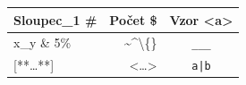 \begin{tabular}{lrc}
\toprule
Sloupec\_1 \# & Počet \$ & Vzor \textless{}a\textgreater{}\\
\midrule
x\_y \& 5\% & \textasciitilde{}\textasciicircum{}\textbackslash{}\{\} & \texttt{\_\_\_}\\
{}[**…**] & \textless{}…\textgreater{} & \texttt{a|b}\\
\bottomrule
\end{tabular}
